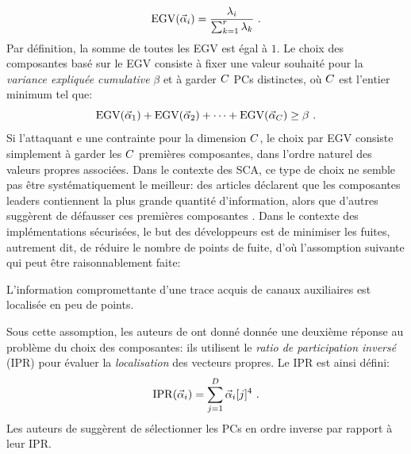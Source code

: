 \begin{equation}\label{eq:EGV}
\mathrm{EGV}(\vec{\alpha}_i) =  \frac{\lambda_i}{\sum_{k=1}^r\lambda_k} \mbox{ .}
\end{equation}
Par définition, la somme de toutes les EGV est égal à $1$. Le choix des composantes basé sur le EGV consiste à fixer une valeur souhaité pour la \emph{variance expliquée cumulative} $\beta$ et à garder $C$ PCs distinctes, où $C$ est l'entier minimum tel que: 
\begin{equation}
\mbox{EGV}(\vec{\alpha}_1) +\mbox{EGV}(\vec{\alpha}_2) + \dots +\mbox{EGV}(\vec{\alpha}_C) \geq \beta \mbox{  .}
\end{equation}
Si l'attaquant e une contrainte pour la dimension $C$, le choix par EGV consiste simplement à garder les $C$ premières composantes, dans l'ordre naturel des valeurs propres associées. Dans le contexte des SCA, ce type de choix ne semble pas être systématiquement le meilleur: des articles déclarent que les composantes leaders contiennent la plus grande quantité d'information, alors que d'autres suggèrent de défausser ces premières composantes \cite{Batina2012,specht}. 
%
%
Dans le contexte des implémentations sécurisées, le but des développeurs est de minimiser les fuites, autrement dit, de réduire le nombre de points de fuite, d'où l'assomption suivante qui peut être raisonnablement faite: 

\begin{assumption}\label{assum:local}
L'information compromettante d'une trace acquis de canaux auxiliaires est localisée en peu de points. 
\end{assumption}
Sous cette assomption, les auteurs de \cite{SCAclassProbl} ont donné donnée une deuxième réponse au problème du choix des composantes: ils utilisent le \emph{ratio de participation inversé} (IPR) pour évaluer la \emph{localisation} des vecteurs propres. Le IPR est ainsi défini:
\begin{equation}
\mathrm{IPR}(\vec{\alpha}_i) = \sum_{j=1}^D \vec{\alpha}_i[j]^4 \mbox{ .}
\end{equation}
Les auteurs de \cite{SCAclassProbl} suggèrent de sélectionner les PCs en ordre inverse par rapport à leur IPR. \\

